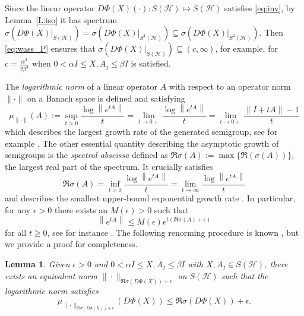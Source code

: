 \documentclass[12pt,reqno]{amsart}
\newtheorem{lemma}[theorem]{Lemma}
\begin{document}
Since the linear operator $D\Phi(X)(\cdot):S(\mathcal{H})\mapsto S(\mathcal{H})$ satisfies \eqref{eq:inv}, by Lemma~\ref{L:iso} it has spectrum $\sigma(D\Phi(X)|_{S(\mathcal{H})})=\sigma(D\Phi(X)|_{S^{1}(\mathcal{H})})\subseteq \sigma(D\Phi(X)|_{S^{2}(\mathcal{H})})$. Then \eqref{eq:wass_P} ensures that $\sigma(D\Phi(X)|_{S(\mathcal{H})})\subseteq (c,\infty)$, for example, for $c=\frac{\alpha^{3}}{2\beta^{4}}$ when $0<\alpha I \leq X,A_j \leq \beta I$ is satisfied.


The \emph{logarithmic norm} of a linear operator $A$ with respect to an operator norm $\|\cdot\|$ on a Banach space is defined and satisfying
\begin{equation*}
\mu_{\|\cdot\|}(A):=\sup_{t>0}\frac{\log\left\|e^{tA}\right\|}{t}=\lim_{t\to 0+}\frac{\log\left\|e^{tA}\right\|}{t}=\lim_{t\to 0+}\frac{\|I+tA\|-1}{t}
\end{equation*}
which describes the largest growth rate of the generated semigroup, see for example \cite{DaleckiiKrein,PerovKostrub}. The other essential quantity describing the asymptotic growth of semigroups is the \emph{spectral abscissa} defined as $\Re\sigma(A):=\max\{\Re (\sigma(A))\}$, the largest real part of the spectrum. It crucially satisfies
\begin{equation*}
\Re\sigma(A)=\inf_{t>0}\frac{\log\left\|e^{tA}\right\|}{t}=\lim_{t\to \infty}\frac{\log\left\|e^{tA}\right\|}{t}
\end{equation*}
and describes the smallest upper-bound exponential growth rate \cite{DaleckiiKrein,PerovKostrub}. In particular, for any $\epsilon>0$ there exists an $M(\epsilon)>0$ such that
\begin{equation*}
\left\|e^{tA}\right\|\leq M(\epsilon)e^{t(\Re\sigma(A)+\epsilon)}
\end{equation*}
for all $t\geq 0$, see for instance \cite{DaleckiiKrein}. The following renorming procedure is known \cite{PerovKostrub}, but we provide a proof for completeness.

\begin{lemma}\label{L:equiNorm}
Given $\epsilon>0$ and $0<\alpha I \leq X,A_j \leq \beta I$ with $X,A_j\in S(\mathcal{H})$, there exists an equivalent norm $\|\cdot\|_{\Re\sigma(D\Phi(X))+\epsilon}$ on $S(\mathcal{H})$ such that the logarithmic norm satisfies
\begin{equation}\label{eq:L:equiNorm}
\mu_{\|\cdot\|_{\Re\sigma(D\Phi(X))+\epsilon}}(D\Phi(X))\leq \Re\sigma(D\Phi(X))+\epsilon.
\end{equation}
\end{lemma}
\end{document}
